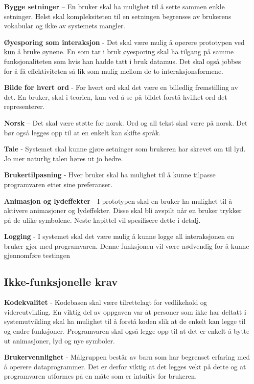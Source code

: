  
 
\indent\textbf{Bygge setninger} – En bruker skal ha mulighet til å sette sammen enkle setninger. Helst skal kompleksiteten til  en setningen begrenses av brukerens vokabular og ikke av systemets mangler.
 
\textbf{Øyesporing som interaksjon} - Det skal være mulig å operere prototypen ved \underline{kun} å bruke øynene. En som tar i bruk øyesporing skal ha tilgang  på samme funksjonaliteten som hvis han hadde tatt i bruk datamus. Det skal også jobbes for å få effektiviteten så lik som mulig mellom de to interaksjonsformene. 
 
\textbf{Bilde for hvert ord} - For hvert ord skal det være en billedlig fremstilling av det. En bruker, skal i teorien, kun ved å se på bildet forstå hvilket ord det representerer. 

\textbf{Norsk} – Det skal være støtte for norsk. Ord og all tekst skal være på norsk.
Det bør også legges opp til at en enkelt kan skifte språk. 

\textbf{Tale} - Systemet skal kunne gjøre setninger som brukeren har skrevet om til lyd. Jo mer naturlig talen høres ut jo bedre.
  
\textbf{Brukertilpasning} - Hver bruker skal ha mulighet til å kunne tilpasse programvaren etter sine preferanser.
  
\textbf{Animasjon og lydeffekter } - I prototypen skal en bruker ha mulighet til å aktivere animasjoner og lydeffekter. Disse skal bli avspilt når en bruker trykker på de ulike symbolene.  Neste kapittel vil spesifisere dette i detalj.

\textbf{Logging} - I systemet skal det være mulig å kunne logge all interaksjonen en bruker gjør med programvaren. Denne funksjonen vil være nødvendig for å kunne gjennomføre testingen 

\subsection{Ikke-funksjonelle krav} 

\indent\textbf{Kodekvalitet} - Kodebasen skal være tilrettelagt for vedlikehold og videreutvikling. En viktig del av oppgaven var at personer som ikke har deltatt i systemutvikling skal ha mulighet til å forstå koden slik at de enkelt kan legge til og endre funksjoner. Programvaren skal også legge opp til at det er enkelt å bytte ut animasjoner, lyd og nye symboler. 

\textbf{Brukervennlighet} - Målgruppen består av barn som har begrenset erfaring med å operere dataprogrammer. Det er derfor viktig at det legges vekt på dette og at programvaren utformes på en måte som er intuitiv for brukeren.   
 
